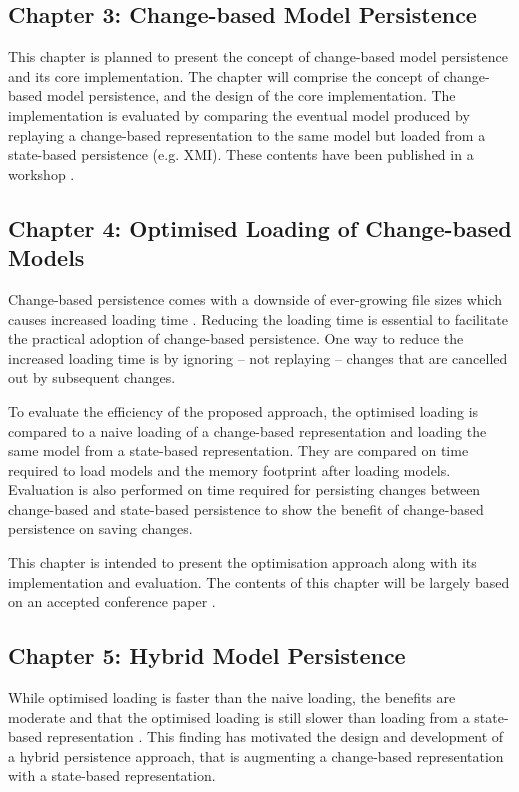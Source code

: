 \subsection{Chapter 3: Change-based Model Persistence}
\label{sec:chapter_3_Change-based_model_ersistence_plan}
This chapter is planned to present the concept of change-based model persistence and its core implementation. The chapter will comprise the concept of change-based model persistence, and the design of the core implementation. The implementation is evaluated by comparing the eventual model produced by replaying a change-based representation to the same model but loaded from a state-based persistence (e.g. XMI). These contents have been published in a workshop \cite{DBLP:conf/models/YohannisKP17}.


\subsection{Chapter 4: Optimised Loading of Change-based Models}
\label{sec:chapter_4_optimised_loading_change_based_model_persistence}

Change-based persistence comes with a downside of ever-growing file sizes \cite{DBLP:journals/entcs/RobbesL07,DBLP:conf/edoc/KoegelHLHD10} which causes increased loading time \cite{mens2002state}. Reducing the loading time is essential to facilitate the practical adoption of change-based persistence. One way to reduce the increased loading time is by ignoring -- not replaying -- changes that are cancelled out by subsequent changes. 

To evaluate the efficiency of the proposed approach, the optimised loading is compared to a naive loading of a change-based representation and loading the same model from a state-based representation. They are compared on time required to load models and the memory footprint after loading models. Evaluation is also performed on time required for persisting changes between change-based and state-based persistence to show the benefit of change-based persistence on saving changes. 

This chapter is intended to present the optimisation approach along with its implementation and evaluation. The contents of this chapter will be largely based on an accepted conference paper \cite{yohannis2018towards}. 

\subsection{Chapter 5: Hybrid Model Persistence}
\label{sec:chapter_5_hybrid_model_persistence}
While optimised loading is faster than the naive loading, the benefits are moderate and that the optimised loading is still slower than loading from a state-based representation \cite{yohannis2018towards}. This finding has motivated the design and development of a hybrid persistence approach, that is augmenting a change-based representation with a state-based representation. 

